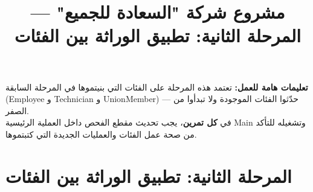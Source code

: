 \documentclass[14pt]{extarticle}
\title{مشروع شركة "السعادة للجميع" — المرحلة الثانية: تطبيق الوراثة بين الفئات}
\begin{document}
\maketitle
\thispagestyle{fancy}

\begin{boxWarning}
\textbf{تعليمات هامة للعمل:}
تعتمد هذه المرحلة على الفئات التي بنيتموها في المرحلة السابقة (\textenglish{Employee} و \textenglish{Technician} و \textenglish{UnionMember}) — حدّثوا الفئات الموجودة ولا تبدأوا من الصفر. \\
في \textbf{كل تمرين}، يجب تحديث مقطع الفحص داخل العملية الرئيسية \textenglish{Main} وتشغيله للتأكد من صحة عمل الفئات والعمليات الجديدة التي كتبتموها.
\end{boxWarning}

\section*{المرحلة الثانية: تطبيق الوراثة بين الفئات}
\end{document}
